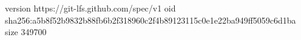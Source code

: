 version https://git-lfs.github.com/spec/v1
oid sha256:a5b8f52b9832b88fb6b2f318960c2f4b89123115c0e1e22ba949ff5059c6d1ba
size 349700
